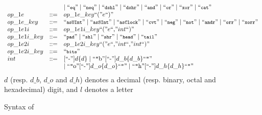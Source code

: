 \begin{figure}[htbp]
{\[\begin{array}{l l l}
& &   \mid \mbox{``\fnprettyll{eq}''} \mid \mbox{``\fnprettyll{neq}''}  \mid \mbox{``\fnprettyll{dshl}''}  \mid \mbox{``\fnprettyll{dshr}''} \mid \mbox{``\fnprettyll{and}''} \mid \mbox{``\fnprettyll{or}''} \mid \mbox{``\fnprettyll{xor}''} \mid \mbox{``\fnprettyll{cat}''} \\
op\_1e & ::= & op\_1e\_key \mbox{``(''}  e \mbox{``)''} \\
op\_1e\_key & ::= & \mbox{``\fnprettyll{asUInt}''} \mid \mbox{``\fnprettyll{asSInt}''} \mid \mbox{``\fnprettyll{asClock}''} \mid \mbox{``\fnprettyll{cvt}''} \mid \mbox{``\fnprettyll{neg}''} \mid \mbox{``\fnprettyll{not}''}  \mid \mbox{``\fnprettyll{andr}''} \mid \mbox{``\fnprettyll{orr}''} \mid  \mbox{``\fnprettyll{xorr}''}\\
%
op\_1e1i & ::= & op\_1e1i\_key \mbox{``(''}  e \mbox{``,''} int \mbox{``)''} \\
op\_1e1i\_key & ::= & \mbox{``\fnprettyll{pad}''} \mid \mbox{``\fnprettyll{shl}''} \mid \mbox{``\fnprettyll{shr}''} \mid \mbox{``\fnprettyll{head}''} \mid \mbox{``\fnprettyll{tail}''} \\
op\_1e2i & ::= & op\_1e2i\_key \mbox{``(''}  e \mbox{``,''}  int  \mbox{``,''}  int \mbox{``)''} \\
op\_1e2i\_key & ::= & \mbox{``\fnprettyll{bits}''}\\
%
int & ::= & [\mbox{``-''}] d \{d\} \mid \mbox{``{\tt "}b''} [\mbox{``-''}] d\_b \{d\_b\} \mbox{``{\tt "}''} \\
& & \mid \mbox{``{\tt "}o''} [\mbox{``-''}] d\_o \{d\_o\} \mbox{``{\tt "}''} \mid
\mbox{``{\tt "}h''} [\mbox{``-''}] d\_h \{d\_h\} \mbox{``{\tt "}''} \\
%
%

%
\end{array}
\]
$d$ (resp. $d\_b$, $d\_o$ and $d\_h$) denotes a decimal (resp. binary, octal and hexadecimal) digit, and $l$ denotes a letter
}
\caption{Syntax of {\firrtl} }
\label{fig-firrtl-synt-simp}
\vspace{-4mm}
\end{figure}
